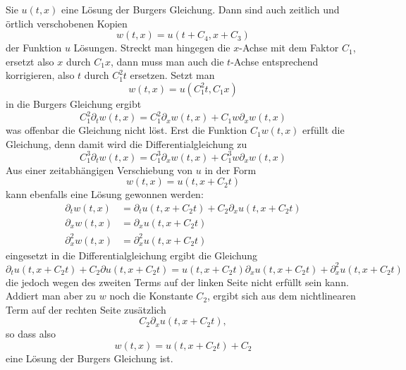 Sie $u(t,x)$ eine Lösung der Burgers Gleichung. Dann sind auch
zeitlich und örtlich verschobenen Kopien
\[
w(t,x)=u(t+C_4, x+C_3)
\]
der Funktion $u$ Lösungen.
Streckt man hingegen die $x$-Achse mit dem Faktor $C_1$, ersetzt
also $x$ durch $C_1x$, dann
muss man auch die $t$-Achse entsprechend korrigieren, also $t$
durch $C_1^2t$ ersetzen. Setzt man
\[
w(t,x)=u(C_1^2t,C_1x)
\]
in die Burgers Gleichung ergibt
\[
C_1^2\partial_t w(t,x)=C_1^2\partial_xw(t,x)+C_1w\partial_xw(t,x)
\]
was offenbar die Gleichung nicht löst. Erst die Funktion $C_1w(t,x)$
erfüllt die Gleichung, denn damit wird die Differentialgleichung zu
\[
C_1^3\partial_t w(t,x)=C_1^3\partial_xw(t,x)+C_1^3w\partial_xw(t,x)
\]
Aus einer zeitabhängigen Verschiebung von $u$ in der Form
\[
w(t,x)=u(t,x+C_2t)
\]
kann ebenfalls eine Lösung gewonnen werden:
\begin{align*}
\partial_t w(t,x)&=\partial_t u(t,x+C_2t)+C_2\partial_x u(t,x+C_2t)
\\
\partial_x w(t,x)&=\partial_x u(t,x+C_2t)
\\
\partial_x^2 w(t,x)&=\partial_x^2 u(t,x+C_2t)
\end{align*}
eingesetzt in die Differentialgleichung ergibt die Gleichung
\[
\partial_t u(t,x+C_2t)+C_2\partial u(t,x+C_2t)
=
u(t,x+C_2t)\partial_xu(t,x+C_2t)
+
\partial_x^2 u(t,x+C_2t)
\]
die jedoch wegen des zweiten Terms auf der linken Seite nicht erfüllt
sein kann. Addiert man aber zu $w$ noch die Konstante $C_2$, ergibt sich
aus dem nichtlinearen Term auf der rechten Seite zusätzlich
\[
C_2\partial_xu(t,x+C_2t),
\]
so dass also
\[
w(t,x)=u(t,x+C_2t)+C_2
\]
eine Lösung der Burgers Gleichung ist.

